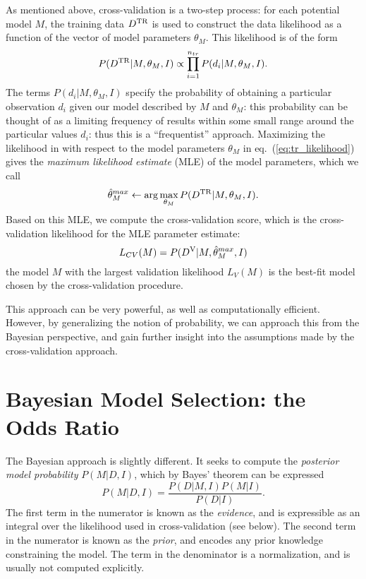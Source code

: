 \documentclass[12pt]{article}
\newcommand{\Dtr}{\ensuremath{D^{\rm TR}}}
\newcommand{\Dva}{\ensuremath{D^{\rm V}}}
\newcommand{\eqn}[1]{eq.~(\ref{eq:#1})}
\begin{document}
As mentioned above, cross-validation is a two-step process:
for each potential model $M$, the
training data \Dtr{} is used to construct the data likelihood as a function
of the vector of model parameters $\theta_M$.  This likelihood is of the form
\begin{equation}
  \label{eq:tr_likelihood}
  P(\Dtr|M, \theta_M, I) \propto \prod_{i=1}^{n_{tr}}P(d_i|M, \theta_M, I).
\end{equation}
The terms $P(d_i|M, \theta_M, I)$ specify the probability of obtaining a
particular observation $d_i$ given our model described by $M$ and $\theta_M$:
this probability can be thought of as a limiting frequency of results within
some small range around the particular values $d_i$: thus this is a
``frequentist'' approach.
Maximizing the likelihood in with respect to the model parameters $\theta_M$
in \eqn{tr_likelihood} gives the {\it maximum likelihood estimate} (MLE)
of the model parameters, which we call
\begin{equation}
  \hat{\theta}_M^{max} \leftarrow \arg\max_{\theta_M} P(\Dtr|M, \theta_M, I).
\end{equation}
Based on this MLE, we compute the cross-validation score, which is the
cross-validation likelihood for the MLE parameter estimate:
\begin{equation}
  \label{eq:CV_likelihood}
  L_{CV}(M) = P(\Dva|M, \hat{\theta}_M^{max}, I)
\end{equation}
the model $M$ with the largest validation likelihood $L_{V}(M)$ is the
best-fit model chosen by the cross-validation procedure.

This approach can be very powerful, as well as computationally efficient.
However, by generalizing the notion of probability, we can approach this
from the Bayesian perspective, and gain further insight into the assumptions
made by the cross-validation approach.

\section{Bayesian Model Selection: the Odds Ratio}
The Bayesian approach is slightly different.  It seeks to compute the
{\it posterior model probability} $P(M|D,I)$, which by Bayes' theorem
can be expressed
\begin{equation}
  \label{eq:bayes_theorem}
  P(M|D,I) = \frac{P(D|M,I)P(M|I)}{P(D|I)}.
\end{equation}
The first term in the numerator is known as the {\it evidence},
and is expressible as an integral over the likelihood used
in cross-validation (see below).
The second term in the numerator is known
as the {\it prior}, and encodes any prior knowledge constraining the model.
The term in the denominator is a normalization, and is usually not
computed explicitly.
\end{document}
